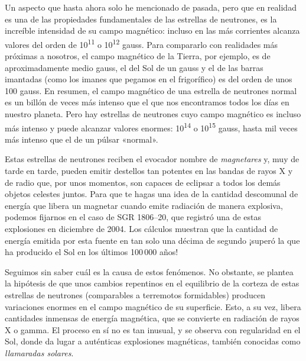 Un aspecto que hasta ahora solo he mencionado de pasada, pero que en realidad es una de las propiedades fundamentales de las estrellas de neutrones, es la increíble intensidad de su campo magnético: incluso en las más corrientes alcanza valores del orden de 10\textsuperscript{11} o 10\textsuperscript{12} gauss. Para compararlo con realidades más próximas a nosotros, el campo magnético de la Tierra, por ejemplo, es de aproximadamente medio gauss, el del Sol de un gauss y el de las barras imantadas (como los imanes que pegamos en el frigorífico) es del orden de unos 100 gauss. En resumen, el campo magnético de una estrella de neutrones normal es un billón de veces más intenso que el que nos encontramos todos los días en nuestro planeta. Pero hay estrellas de neutrones cuyo campo magnético es incluso más intenso y puede alcanzar valores enormes: 10\textsuperscript{14} o 10\textsuperscript{15} gauss, hasta mil veces más intenso que el de un púlsar «normal».

Estas estrellas de neutrones reciben el evocador nombre de \emph{magnetares} y, muy de tarde en tarde, pueden emitir destellos tan potentes en las bandas de rayos X y de radio que, por unos momentos, son capaces de eclipsar a todos los demás objetos celestes juntos. Para que te hagas una idea de la cantidad descomunal de energía que libera un magnetar cuando emite radiación de manera explosiva, podemos fijarnos en el caso de SGR 1806--20, que registró una de estas explosiones en diciembre de 2004. Los cálculos muestran que la cantidad de energía emitida por esta fuente en tan solo una décima de segundo ¡superó la que ha producido el Sol en los últimos 100\,000 años!

Seguimos sin saber cuál es la causa de estos fenómenos. No obstante, se plantea la hipótesis de que unos cambios repentinos en el equilibrio de la corteza de estas estrellas de neutrones (comparables a terremotos formidables) producen variaciones enormes en el campo magnético de su superficie. Esto, a su vez, libera cantidades inmensas de energía magnética, que se convierte en radiación de rayos X o gamma. El proceso en sí no es tan inusual, y se observa con regularidad en el Sol, donde da lugar a auténticas explosiones magnéticas, también conocidas como \emph{llamaradas solares}.

